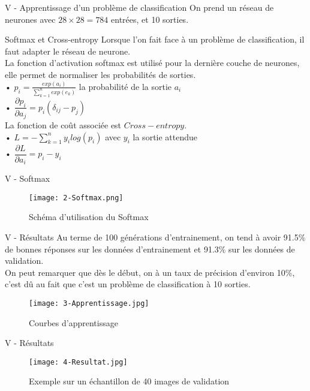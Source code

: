 \documentclass[10pt]{beamer}
\begin{document}
\begin{frame}{V - Apprentissage d'un problème de classification}
On prend un réseau de neurones avec $28 \times 28 = 784$ entrées, et 10 sorties. \\
\begin{block}{Softmax et Cross-entropy}
Lorsque l'on fait face à un problème de classification, il faut adapter le réseau de neurone. \\
La fonction d'activation softmax est utilisé pour la dernière couche de neurones, elle permet de normaliser les probabilités de sorties. \\
• $p_i = \frac{exp(a_i)}{\sum_{k=1}^{n}exp(e_k)}$ la probabilité de la sortie $a_i$ \\
• $\dfrac{\partial p_i}{\partial a_j} = p_i(\delta_{ij}-p_j)$ \\
La fonction de coût associée est $Cross-entropy$. \\
• $L = -\sum_{k=1}^{n}y_ilog(p_i)$ avec $y_i$ la sortie attendue \\
• $\dfrac{\partial L}{\partial a_i} = p_i - y_i$
\end{block}
\end{frame}

\begin{frame}{V - Softmax}
\begin{figure}
	\centering
    \texttt{[image: 2-Softmax.png]}
	\caption{Schéma d'utilisation du Softmax}
\end{figure}
\end{frame}

\begin{frame}{V - Résultats}
Au terme de 100 générations d'entrainement, on tend à avoir 91.5\% de bonnes réponses sur les données d'entrainement et 91.3\% sur les données de validation. \\
On peut remarquer que dès le début, on à un taux de précision d'environ 10\%, c'est dû au fait que c'est un problème de classification à 10 sorties.
\begin{figure}
	\centering
    \texttt{[image: 3-Apprentissage.jpg]}
	\caption{Courbes d'apprentissage}
\end{figure}
\end{frame}

\begin{frame}{V - Résultats}
\begin{figure}
	\centering
    \texttt{[image: 4-Resultat.jpg]}
	\caption{Exemple sur un échantillon de 40 images de validation}
\end{figure}
\end{frame}
\end{document}
